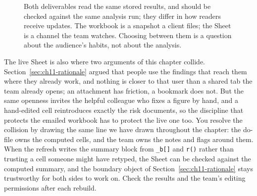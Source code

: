 \documentclass[
    a4paper,
    fontsize=10pt,
    twoside=true,
    numbers=noenddot,
]{kaobook}
\begin{document}
\begin{figure}[htbp]
\centering
{}
\caption[Two delivery surfaces, one source]{Both deliverables read the same stored results, and should be checked against the same analysis run; they differ in how readers receive updates. The workbook is a snapshot a client files; the Sheet is a channel the team watches. Choosing between them is a question about the audience's habits, not about the analysis.}
\label{fig:ch11-viz-twopaths}
\end{figure}

The live Sheet is also where two arguments of this chapter collide. Section~\ref{sec:ch11-rationale} argued that people use the findings that reach them where they already work, and nothing is closer to that user than a shared tab the team already opens; an attachment has friction, a bookmark does not. But the same openness invites the helpful colleague who fixes a figure by hand, and a hand-edited cell reintroduces exactly the risk \textcite{panko1998errors} documents, so the discipline that protects the emailed workbook has to protect the live one too. You resolve the collision by drawing the same line we have drawn throughout the chapter: the do-file owns the computed cells, and the team owns the notes and flags around them. When the refresh writes the summary block from \texttt{\_b[]} and \texttt{r()} rather than trusting a cell someone might have retyped, the Sheet can be checked against the computed summary, and the boundary object of Section~\ref{sec:ch11-rationale} stays trustworthy for both sides to work on. Check the results and the team's editing permissions after each rebuild.
\end{document}
